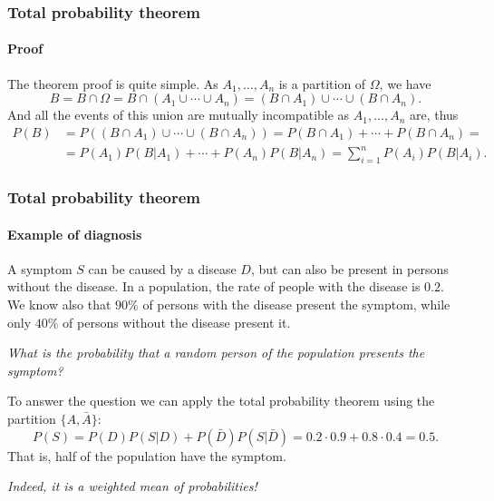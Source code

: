 \begin{frame}
\frametitle{Total probability theorem}
\framesubtitle{Proof}
The theorem proof is quite simple.
As $A_1,\ldots,A_n$ is a partition of $\Omega$, we have 
\[
B = B\cap \Omega = B\cap (A_1\cup \cdots \cup A_n) = (B\cap A_1)\cup \cdots \cup (B\cap A_n).
\]
And all the events of this union are mutually incompatible as $A_1,\ldots,A_n$ are, thus
\begin{align*}
P(B) &= P((B\cap A_1)\cup \cdots \cup (B\cap A_n)) = P(B\cap A_1)+\cdots + P(B\cap A_n) =\\
&= P(A_1)P(B|A_1)+\cdots + P(A_n)P(B|A_n) = \sum_{i=1}^n P(A_i)P(B|A_i).
\end{align*}

\begin{center}
\end{center}
\end{frame}


\begin{frame}
\frametitle{Total probability theorem}
\framesubtitle{Example of diagnosis}
A symptom $S$ can be caused by a disease $D$, but can also be present in persons without the disease.
In a population, the rate of people with the disease is $0.2$. 
We know also that $90\%$ of persons with the disease present the symptom, while only $40\%$ of persons without the
disease present it. 

\emph{What is the probability that a random person of the population presents the symptom?}

To answer the question we can apply the total probability theorem using the partition $\{A,\bar A\}$:
\[
P(S) = P(D)P(S|D)+P(\bar D)P(S|\bar D) = 0.2\cdot 0.9 + 0.8\cdot 0.4 = 0.5.
\]
That is, half of the population have the symptom. 

\begin{center}
\emph{Indeed, it is a weighted mean of probabilities!}
\end{center}
\end{frame}


